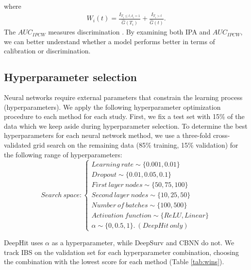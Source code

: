 \documentclass[preprint,12pt]{elsarticle}
\begin{document}
where \begin{align*}
W_{i}(t)=\frac{I_{T_{i}\leq t,\delta_{i}=1}}{\widehat{G}(T_{i})} +\frac{I_{T_{i}>t}}{\widehat{G}(t)}.
\end{align*} The $AUC_{IPCW}$ measures discrimination \citep{auc}. By examining both IPA and $AUC_{IPCW}$,
we can better understand whether a model performs better in terms of calibration or discrimination.

\hypertarget{hyperparameter-selection}{%
\subsection{Hyperparameter selection}\label{hyperparameter-selection}}

Neural networks require external parameters that constrain the learning process (hyperparameters). We apply the following hyperparameter
optimization procedure to each method for each study. First, we fix a test set with 15\% of the data which we keep aside during hyperparameter selection.
To determine the best hyperparameters for each neural network method, we use a three-fold cross-validated grid search \citep{gulli2017} on the remaining
data (85\% training, 15\% validation) for the following range of hyperparameters:
\[
Search \ space: \begin{cases}
Learning\ rate \sim \{0.001, 0.01\} \\ 
Dropout \sim \{0.01,0.05, 0.1\} \\
First\ layer\ nodes \sim \{50, 75, 100\} \\
Second\ layer\ nodes \sim \{10,25,50\} \\
Number\ of\ batches \sim \{100, 500\} \\
Activation\ function \sim \{ReLU, Linear\}\\
\alpha \sim \{0, 0.5, 1\}. \ (DeepHit \ only)
\end{cases}
\] 


DeepHit uses $\alpha$ as a hyperparameter, while DeepSurv and CBNN do not. We track IBS on the validation set for each hyperparameter combination,
choosing the combination with the lowest score for each method (Table \ref{tab:wins}).
\end{document}
